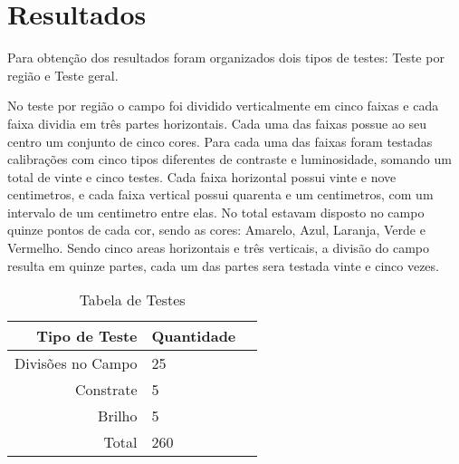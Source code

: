 \chapter{Resultados} 

Para obtenção dos resultados foram organizados dois tipos de testes: Teste por região e
Teste geral.

No teste por região o campo foi dividido verticalmente em cinco faixas e cada faixa dividia em três partes horizontais. Cada uma das faixas possue ao seu centro um conjunto de cinco cores.
Para cada uma das faixas foram testadas calibrações com cinco tipos diferentes de contraste e luminosidade, somando um total de vinte e cinco testes.
Cada faixa horizontal possui vinte e nove centimetros, e cada faixa vertical possui quarenta e um centimetros, com um intervalo de um centimetro entre elas.
No total estavam disposto no campo quinze pontos de cada cor, sendo as cores: Amarelo, Azul, Laranja, Verde e Vermelho.
Sendo cinco areas horizontais e três verticais, a divisão do campo resulta em quinze partes, cada um das partes sera testada vinte e cinco vezes.


\begin{table}[h]
\centering
\caption{Tabela de Testes}
\begin{tabular}{r|lr}
 
Tipo de Teste & Quantidade \\ %
\hline                               %
Divisões no Campo        & 25 \\
Constrate  & 5\\
Brilho            & 5 \\
\hline  
Total & 260
 
\end{tabular}
\end{table}
